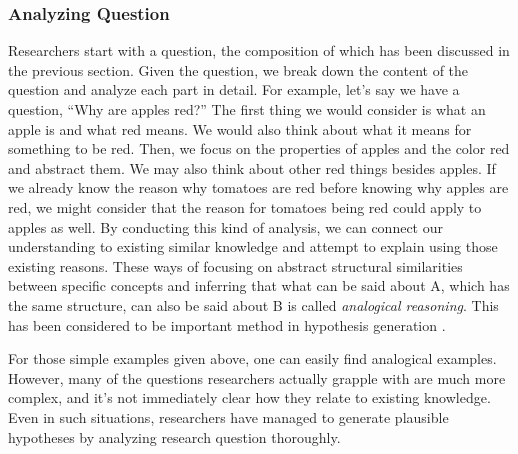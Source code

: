 \documentclass{book}
\begin{document}

\subsubsection{Analyzing Question}
Researchers start with a question, the composition of which has been discussed in the previous section. Given the question, we break down the content of the question and analyze each part in detail. For example, let's say we have a question, ``Why are apples red?'' The first thing we would consider is what an apple is and what red means. We would also think about what it means for something to be red. Then, we focus on the properties of apples and the color red and abstract them. We may also think about other red things besides apples. If we already know the reason why tomatoes are red before knowing why apples are red, we might consider that the reason for tomatoes being red could apply to apples as well. By conducting this kind of analysis, we can connect our understanding to existing similar knowledge and attempt to explain using those existing reasons. These ways of focusing on abstract structural similarities between specific concepts and inferring that what can be said about A, which has the same structure, can also be said about B is called \textit{analogical reasoning}. This has been considered to be important method in hypothesis generation \cite{hesse1965models,thagard_1984,gentner1993shift,holyoak1996mental,dunbar1997scientists}.

For those simple examples given above, one can easily find analogical examples. However, many of the questions researchers actually grapple with are much more complex, and it's not immediately clear how they relate to existing knowledge. Even in such situations, researchers have managed to generate plausible hypotheses by analyzing research question thoroughly.
\end{document}
